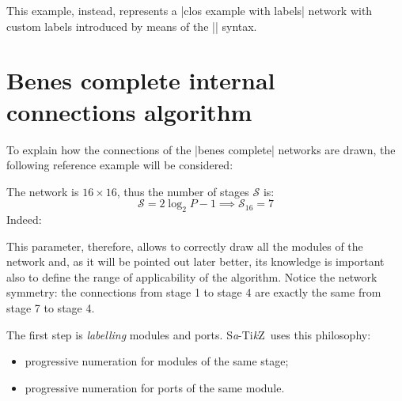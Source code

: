 \documentclass{ltxdoc} %
\newcommand\Tikz{Ti\textit kZ}
\newcommand{\saTikZ}{\textsc S\textit a-\Tikz}
\begin{document}
This example, instead, represents a |clos example with labels| network with custom labels introduced by means of the |\tikzset| syntax.

\begin{codeexample}[]
\end{codeexample}


\clearpage
\appendix

\section{Benes complete internal connections algorithm}
\label{sec:benesconnalg}
To explain how the connections of the |benes complete| networks are drawn, the following reference example will be considered:
\begin{center}
\scalebox{0.75}{
	\begin{tikzpicture}[module size=0.75cm, module ysep=1, module xsep=2.5]
		\node[P=16, benes complete]{};
	\end{tikzpicture}
}
\end{center}
The network is $16\times 16$, thus the number of stages $\mathcal{S}$ is:
\[\mathcal{S}=2\log_2{P}-1 \implies \mathcal{S}_{16}=7\]
Indeed:
\begin{center}
\end{center}
This parameter, therefore, allows to correctly draw all the modules of the network and, as it will be pointed out later better, its knowledge is important also to define the range of applicability of the algorithm. Notice the network symmetry: the connections from stage 1 to stage 4 are exactly the same from stage 7 to stage 4.  

The first step is \emph{labelling} modules and ports. \saTikZ\ uses this philosophy:
\begin{itemize}
\item progressive numeration for modules of the same stage;
\item progressive numeration for ports of the same module.
\end{itemize}
\end{document}
